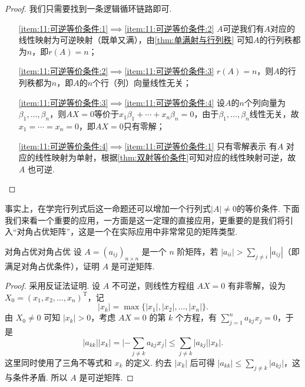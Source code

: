 \begin{proof}
    我们只需要找到一条逻辑循环链路即可.
    \begin{itemize}
        \item[\ref*{item:11:可逆等价条件:1}$\implies$\ref*{item:11:可逆等价条件:2}] $A$可逆我们有$A$对应的线性映射为可逆映射（既单又满），由\autoref{thm:单满射与行列秩} 可知$A$的行列秩都为$n$，即$r(A)=n$；

        \item[\ref*{item:11:可逆等价条件:2}$\implies$\ref*{item:11:可逆等价条件:3}] $r(A)=n$，则$A$的行列秩都为$n$，即$A$的$n$个行（列）向量线性无关；

        \item[\ref*{item:11:可逆等价条件:3}$\implies$\ref*{item:11:可逆等价条件:4}] 设$A$的$n$个列向量为$\beta_1,\ldots,\beta_n$，则$AX=0$等价于$x_1\beta_1+\cdots+x_n\beta_n=0$，由于$\beta_1,\ldots,\beta_n$线性无关，故$x_1=\cdots=x_n=0$，即$AX=0$只有零解；

        \item[\ref*{item:11:可逆等价条件:4}$\implies$\ref*{item:11:可逆等价条件:1}] 只有零解表示 有$A$ 对应的线性映射为单射，根据\autoref{thm:双射等价条件}可知对应的线性映射可逆，故 $A$ 也可逆.
    \end{itemize}
\end{proof}

事实上，在学完行列式后这一命题还可以增加一个行列式$|A|\neq 0$的等价条件. 下面我们来看一个重要的应用，一方面是这一定理的直接应用，更重要的是我们将引入``对角占优矩阵''，这是一个在实际应用中非常常见的矩阵类型.
\begin{example}{对角占优}{对角占优}
    设 $A = (a_{ij})_{n \times n}$ 是一个 $n$ 阶矩阵，若 $|a_{ii}| > \displaystyle\sum_{j \neq i}|a_{ij}|$（即满足对角占优条件），证明 $A$ 是可逆矩阵.
\end{example}
\begin{proof}
    采用反证法证明. 设 $A$ 不可逆，则线性方程组 $AX = 0$ 有非零解，设为 $X_0 = (x_1, x_2, \ldots, x_n)^{\mathrm{T}}$，记
    \[\lvert x_k \rvert = \max \{\lvert x_1 \rvert, \lvert x_2 \rvert, \ldots, \lvert x_n \rvert\}.\]
    由 $X_0 \neq 0$ 可知 $\lvert x_k \rvert > 0$，考虑 $AX = 0$ 的第 $k$ 个方程，有 $\displaystyle\sum_{j=1}^n a_{kj}x_j = 0$，于是
    \[\lvert a_{kk} \rvert \lvert x_k \rvert = \lvert -\displaystyle\sum_{j \neq k}a_{kj}x_j \rvert \leqslant \sum_{j \neq k}\lvert a_{kj} \rvert \lvert x_k \rvert.\]
    这里同时使用了三角不等式和 $x_k$ 的定义. 约去 $\lvert x_k \rvert$ 后可得 $\lvert a_{kk} \rvert \leqslant \displaystyle\sum_{j \neq k} \lvert a_{kj} \rvert$，这与条件矛盾. 所以 $A$ 是可逆矩阵.
\end{proof}

